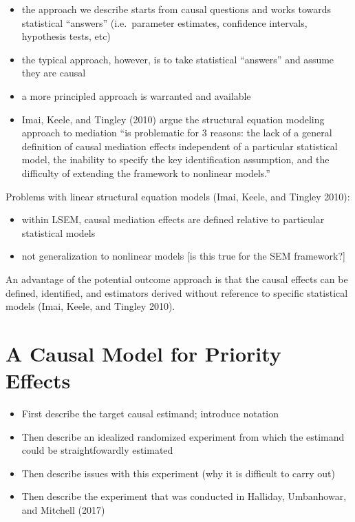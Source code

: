 \documentclass[]{article}
\providecommand{\tightlist}{%
  \setlength{\itemsep}{0pt}\setlength{\parskip}{0pt}}
\begin{document}
\begin{itemize}
\tightlist
\item
  the approach we describe starts from causal questions and works
  towards statistical ``answers'' (i.e.~parameter estimates, confidence
  intervals, hypothesis tests, etc)
\item
  the typical approach, however, is to take statistical ``answers'' and
  assume they are causal
\item
  a more principled approach is warranted and available
\item
  Imai, Keele, and Tingley (2010) argue the structural equation modeling
  approach to mediation ``is problematic for 3 reasons: the lack of a
  general definition of causal mediation effects independent of a
  particular statistical model, the inability to specify the key
  identification assumption, and the difficulty of extending the
  framework to nonlinear models.''
\end{itemize}

Problems with linear structural equation models (Imai, Keele, and
Tingley 2010):

\begin{itemize}
\tightlist
\item
  within LSEM, causal mediation effects are defined relative to
  particular statistical models
\item
  not generalization to nonlinear models {[}is this true for the SEM
  framework?{]}
\end{itemize}

An advantage of the potential outcome approach is that the causal
effects can be defined, identified, and estimators derived without
reference to specific statistical models (Imai, Keele, and Tingley
2010).

\hypertarget{a-causal-model-for-priority-effects}{%
\section{A Causal Model for Priority
Effects}\label{a-causal-model-for-priority-effects}}

\begin{itemize}
\tightlist
\item
  First describe the target causal estimand; introduce notation
\item
  Then describe an idealized randomized experiment from which the
  estimand could be straightfowardly estimated
\item
  Then describe issues with this experiment (why it is difficult to
  carry out)
\item
  Then describe the experiment that was conducted in Halliday,
  Umbanhowar, and Mitchell (2017)
\end{itemize}
\end{document}
